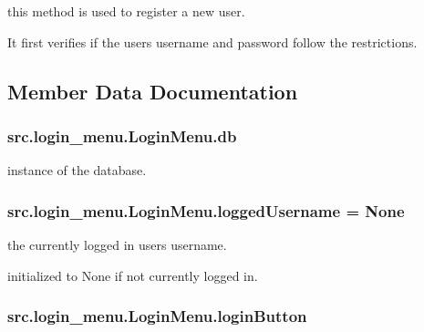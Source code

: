 this method is used to register a new user. 

It first verifies if the user\textquotesingle{}s username and password follow the restrictions. 

\subsection{Member Data Documentation}
\hypertarget{classsrc_1_1login__menu_1_1_login_menu_a9a3d5cb39385fb4b3d10f46af5543205}{}
\subsubsection[{db}]{\setlength{\rightskip}{0pt plus 5cm}src.\+login\+\_\+menu.\+Login\+Menu.\+db}\label{classsrc_1_1login__menu_1_1_login_menu_a9a3d5cb39385fb4b3d10f46af5543205}


instance of the database. 

\hypertarget{classsrc_1_1login__menu_1_1_login_menu_a3c59b83a7a55f2334a015dfc722e86da}{}
\subsubsection[{logged\+Username}]{\setlength{\rightskip}{0pt plus 5cm}src.\+login\+\_\+menu.\+Login\+Menu.\+logged\+Username = None\hspace{0.3cm}{\ttfamily [static]}}\label{classsrc_1_1login__menu_1_1_login_menu_a3c59b83a7a55f2334a015dfc722e86da}


the currently logged in user\textquotesingle{}s username. 

initialized to \textquotesingle{}None\textquotesingle{} if not currently logged in. \hypertarget{classsrc_1_1login__menu_1_1_login_menu_a6e91fe2dc9a5b4bb26019242e84ce986}{}
\subsubsection[{login\+Button}]{\setlength{\rightskip}{0pt plus 5cm}src.\+login\+\_\+menu.\+Login\+Menu.\+login\+Button}\label{classsrc_1_1login__menu_1_1_login_menu_a6e91fe2dc9a5b4bb26019242e84ce986}


